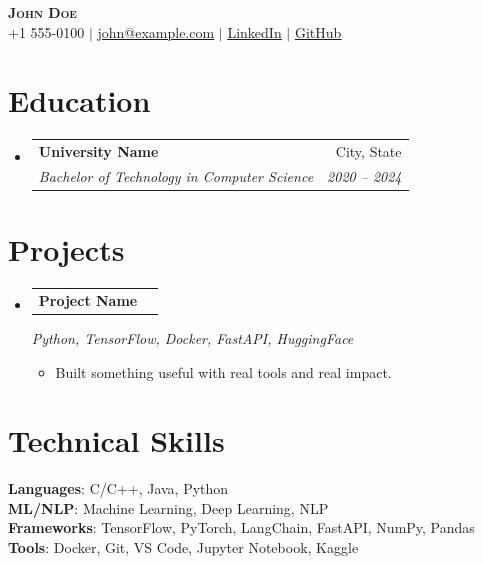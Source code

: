 \documentclass[letterpaper,11pt]{article}
\makeatletter
\newcommand{\resumeItem}[1]{
  \item\small{#1}
}
\newcommand{\resumeSubheading}[4]{
  \item
    \begin{tabularx}{0.95\textwidth}{@{}p{0.75\textwidth} r@{}}
      \textbf{#1} & #2 \\
      \textit{\small#3} & \textit{\small #4} \\
    \end{tabularx}\vspace{-3pt}
}
\newcommand{\resumeProjectHeading}[2]{%
    \item
    \begin{tabularx}{0.95\textwidth}{@{}X r@{}}
      \small\textbf{#1} & #2 \\
    \end{tabularx}\vspace{-2pt}
}
\newcommand{\resumeProjectTech}[1]{%
    \parbox[t]{0.95\textwidth}{\textit{\small #1}}\vspace{-2pt}
}
\newcommand{\resumeSubHeadingListStart}{\begin{itemize}[leftmargin=0.15in, label={}]}
\newcommand{\resumeSubHeadingListEnd}{\end{itemize}}
\newcommand{\resumeItemListStart}{\begin{itemize}}
\newcommand{\resumeItemListEnd}{\end{itemize}}
\makeatother
\begin{document}
\begin{center}
    \textbf{\Huge \scshape John Doe} \\ \vspace{1pt}
    \small +1 555-0100 $|$ \href{mailto:john@example.com}{\underline{john@example.com}} $|$
    \href{https://linkedin.com/in/johndoe}{\underline{LinkedIn}} $|$
    \href{https://github.com/johndoe}{\underline{GitHub}}
\end{center}

\section{Education}
  \resumeSubHeadingListStart
    \resumeSubheading
      {University Name}{City, State}
      {Bachelor of Technology in Computer Science}{2020 -- 2024}
  \resumeSubHeadingListEnd

\section{Projects}
    \resumeSubHeadingListStart
      \resumeProjectHeading
          {\textbf{Project Name}}{}
          \resumeProjectTech{Python, TensorFlow, Docker, FastAPI, HuggingFace}
          \resumeItemListStart
            \resumeItem{Built something useful with real tools and real impact.}
          \resumeItemListEnd
    \resumeSubHeadingListEnd

\section{Technical Skills}
 \begin{itemize}[leftmargin=0.15in, label={}]
    \small{\item{
     \textbf{Languages}{: C/C++, Java, Python} \\
     \textbf{ML/NLP}{: Machine Learning, Deep Learning, NLP} \\
     \textbf{Frameworks}{: TensorFlow, PyTorch, LangChain, FastAPI, NumPy, Pandas} \\
     \textbf{Tools}{: Docker, Git, VS Code, Jupyter Notebook, Kaggle}
    }}
 \end{itemize}

\end{document}
